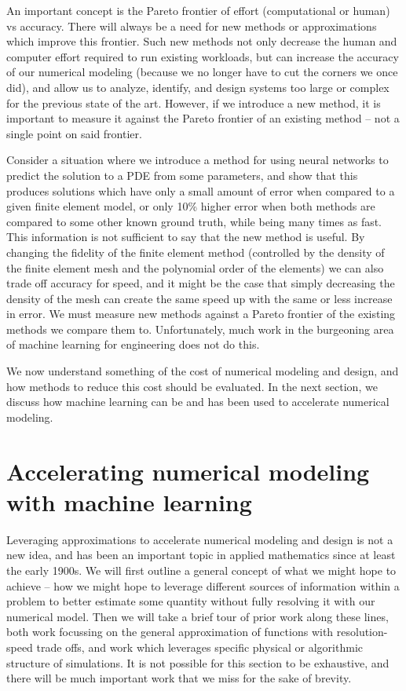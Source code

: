 \documentclass{puthesis}
\begin{document}
An important concept is the Pareto frontier of effort (computational or human) vs accuracy.
There will always be a need for new methods or approximations which improve this frontier.
Such new methods not only decrease the human and computer effort required to run existing
workloads, but can increase the accuracy of our numerical modeling (because we no longer have
to cut the corners we once did), and allow us to analyze, identify, and design systems
too large or complex for the previous state of the art.
However, if we introduce a new method, it is important to measure it against the Pareto frontier of an existing method -- not a single point on said frontier.

Consider a situation where we introduce a method for using neural networks to
predict the solution to a PDE from some parameters, and show that this produces
solutions which have only a small amount of error when compared to a given finite
element model, or only 10\% higher error when both methods are compared to some
other known ground truth, while being many
times as fast. This information is not sufficient to say that the new method is useful.
By changing the fidelity of the finite element method (controlled by the density of
the finite element mesh and the polynomial order of the elements) we can also trade off
accuracy for speed, and it might be the case that simply decreasing the density of the mesh
can create the same speed up with the same or less increase in error.
We must measure new methods against a Pareto frontier of the existing methods we compare them to.
Unfortunately, much work in the burgeoning area of machine learning for engineering does
not do this.

We now understand something of the cost of numerical modeling and design, and how
methods to reduce this cost should be evaluated.
In the next section, we discuss how machine learning can be and has been used
to accelerate numerical modeling.

\section{Accelerating numerical modeling with machine learning}

Leveraging approximations to accelerate numerical modeling and design is not a new idea,
and has been an important topic in applied mathematics since at least the early 1900s.
We will first outline a general concept of what we might hope to achieve -- how we
might hope to leverage different sources of information within a problem to better
estimate some quantity without fully resolving it with our numerical model.
Then we will take a brief tour of prior work along these lines, both work focussing on
the general approximation of functions with resolution-speed trade offs, and
work which leverages specific physical or algorithmic structure of simulations.
It is not possible for this section to be exhaustive, and there will be much important
work that we miss for the sake of brevity.
\end{document}
